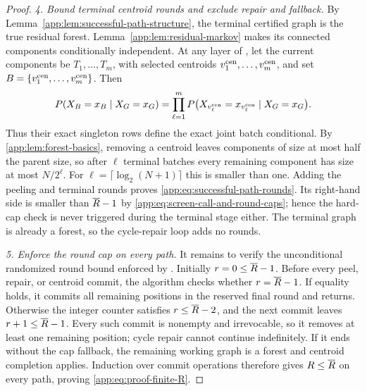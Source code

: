 \begin{proof}
\emph{4. Bound terminal centroid rounds and exclude repair and fallback.}
By Lemma~\ref{app:lem:successful-path-structure}, the terminal certified graph
is the true residual forest.  Lemma~\ref{app:lem:residual-markov} makes its
connected components conditionally independent.  At any layer of
, let
the current components be $T_1,\ldots,T_m$, with selected centroids
$v_{1}^{\mathrm{cen}},\ldots,v_{m}^{\mathrm{cen}}$, and set
$B=\{v_{1}^{\mathrm{cen}},\ldots,v_{m}^{\mathrm{cen}}\}$.  Then
\begin{equation}
 P(X_B=x_B\mid X_G=x_G)
 =\prod_{\ell=1}^m
   P\bigl(X_{v_{\ell}^{\mathrm{cen}}}
   =x_{v_{\ell}^{\mathrm{cen}}}\mid X_G=x_G\bigr).
 \label{app:eq:centroid-batch-factorization}
\end{equation}
Thus their exact singleton rows define the exact joint batch conditional.
By
\cref{app:lem:forest-basics}, removing a centroid leaves components of size at
most half the parent size, so after
$\ell$ terminal batches every remaining component has size at most $N/2^\ell$.
For $\ell=\lceil\log_2(N+1)\rceil$ this is smaller than one.  Adding the peeling
and terminal rounds proves \eqref{app:eq:successful-path-rounds}.  Its
right-hand side is smaller than $\overline R-1$ by
\eqref{app:eq:screen-call-and-round-caps}; hence the hard-cap check is never
triggered during the terminal stage either. The terminal graph is already
a forest, so the cycle-repair loop adds no rounds.


\emph{5. Enforce the round cap on every path.}
It remains to verify the unconditional randomized round bound enforced by
\AlgoGuardRef. Initially $r=0\le\overline R-1$. Before every peel, repair,
or centroid commit, the algorithm checks whether $r=\overline R-1$.
If equality holds, it commits all remaining positions in the reserved
final round and returns. Otherwise the integer counter satisfies
$r\le\overline R-2$, and the next commit leaves
$r+1\le\overline R-1$.
Every such commit is nonempty and irrevocable, so it removes at least
one remaining position; cycle repair cannot continue indefinitely.
If it ends without the cap fallback, the remaining working graph is a
forest and centroid completion applies. Induction over commit operations
therefore gives $R\le\overline R$ on every path, proving
\eqref{app:eq:proof-finite-R}.
\end{proof}
